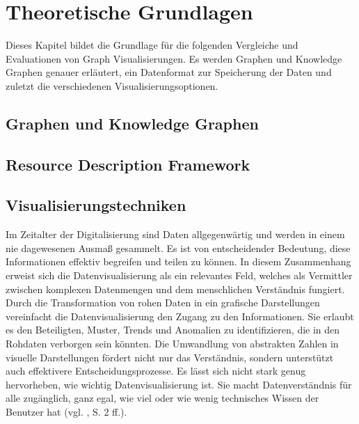 
\chapter{Theoretische Grundlagen}

Dieses Kapitel bildet die Grundlage für die folgenden Vergleiche und Evaluationen von Graph Visualisierungen. Es werden Graphen und Knowledge Graphen genauer erläutert, ein Datenformat zur Speicherung der Daten und zuletzt die verschiedenen Visualisierungsoptionen. 

\section{Graphen und Knowledge Graphen}

\section{Resource Description Framework}

\section{Visualisierungstechniken}

Im Zeitalter der Digitalisierung sind Daten allgegenwärtig und werden in einem nie dagewesenen Ausmaß gesammelt. Es ist von entscheidender Bedeutung, diese Informationen effektiv begreifen und teilen zu können. In diesem Zusammenhang erweist sich die Datenvisualisierung als ein relevantes Feld, welches als Vermittler zwischen komplexen Datenmengen und dem menschlichen Verständnis fungiert. Durch die Transformation von rohen Daten in ein grafische Darstellungen vereinfacht die Datenvisualisierung den Zugang zu den Informationen. Sie erlaubt es den Beteiligten, Muster, Trends und Anomalien zu identifizieren, die in den Rohdaten verborgen sein könnten. Die Umwandlung von abstrakten Zahlen in visuelle Darstellungen fördert nicht nur das Verständnis, sondern unterstützt auch effektivere Entscheidungsprozesse. Es lässt sich nicht stark genug hervorheben, wie wichtig Datenvisualisierung ist. Sie macht Datenverständnis für alle zugänglich, ganz egal, wie viel oder wie wenig technisches Wissen der Benutzer hat (vgl. \cite{unwin:WhyDataVisualization}, S. 2 ff.).

